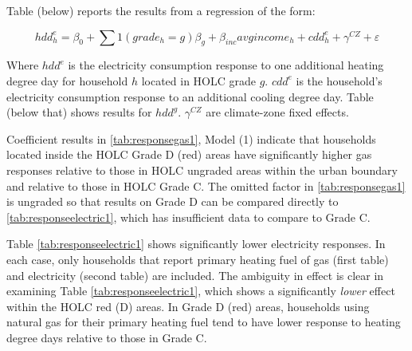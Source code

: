 \documentclass[
]{article}
\begin{document}
Table (below) reports the results from a regression of the form:

\[hdd^e_h = \beta_0 + \sum 1(grade_h=g)\beta_g + \beta_{inc} avgincome_h + cdd^e_h + \gamma^{CZ} + \varepsilon\]

Where \(hdd^e\) is the electricity consumption response to one additional heating degree day for household \(h\) located in HOLC grade \(g\). \(cdd^e\) is the household's electricity consumption response
to an additional cooling degree day. Table (below that) shows results for \(hdd^g\). \(\gamma^{CZ}\) are climate-zone fixed effects.

Coefficient results in \ref{tab:responsegas1}, Model (1) indicate that households located inside the HOLC Grade D (red) areas
have significantly higher gas responses relative to those in HOLC ungraded areas within the urban boundary and relative
to those in HOLC Grade C. The omitted factor in \ref{tab:responsegas1} is ungraded so that results on Grade D can be
compared directly to \ref{tab:responseelectric1}, which has insufficient data to compare to Grade C.

Table \ref{tab:responseelectric1} shows significantly lower electricity responses.
In each case, only households that report primary heating fuel of gas (first table) and electricity (second table) are included.
The ambiguity in effect is clear in examining Table \ref{tab:responseelectric1}, which shows a significantly \emph{lower}
effect within the HOLC red (D) areas. In Grade D (red) areas, households using natural gas for their primary heating fuel
tend to have lower response to heating degree days relative to those in Grade C.
\end{document}
